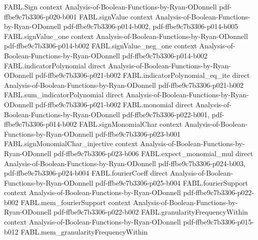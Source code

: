 \begin{theorem}
\label{FABL.kkl}
\leanok
{}
\proofstep
  {FABL.Sign}
  {context}
  {Analysis-of-Boolean-Functions-by-Ryan-ODonnell}
  {pdf-ffbe9c7b3306-p020-b001}
\proofstep
  {FABL.signValue}
  {context}
  {Analysis-of-Boolean-Functions-by-Ryan-ODonnell}
  {pdf-ffbe9c7b3306-p014-b002,
    pdf-ffbe9c7b3306-p014-b005}
\proofstep
  {FABL.signValue_one}
  {context}
  {Analysis-of-Boolean-Functions-by-Ryan-ODonnell}
  {pdf-ffbe9c7b3306-p014-b002}
\proofstep
  {FABL.signValue_neg_one}
  {context}
  {Analysis-of-Boolean-Functions-by-Ryan-ODonnell}
  {pdf-ffbe9c7b3306-p014-b002}
\proofstep
  {FABL.indicatorPolynomial}
  {direct}
  {Analysis-of-Boolean-Functions-by-Ryan-ODonnell}
  {pdf-ffbe9c7b3306-p021-b002}
\proofstep
  {FABL.indicatorPolynomial_eq_ite}
  {direct}
  {Analysis-of-Boolean-Functions-by-Ryan-ODonnell}
  {pdf-ffbe9c7b3306-p021-b002}
\proofstep
  {FABL.sum_indicatorPolynomial}
  {direct}
  {Analysis-of-Boolean-Functions-by-Ryan-ODonnell}
  {pdf-ffbe9c7b3306-p021-b002}
\proofstep
  {FABL.monomial}
  {direct}
  {Analysis-of-Boolean-Functions-by-Ryan-ODonnell}
  {pdf-ffbe9c7b3306-p022-b001,
    pdf-ffbe9c7b3306-p014-b002}
\proofstep
  {FABL.signMonomialChar}
  {context}
  {Analysis-of-Boolean-Functions-by-Ryan-ODonnell}
  {pdf-ffbe9c7b3306-p023-b001}
\proofstep
  {FABL.signMonomialChar_injective}
  {context}
  {Analysis-of-Boolean-Functions-by-Ryan-ODonnell}
  {pdf-ffbe9c7b3306-p023-b006}
\proofstep
  {FABL.expect_monomial_mul}
  {direct}
  {Analysis-of-Boolean-Functions-by-Ryan-ODonnell}
  {pdf-ffbe9c7b3306-p024-b003,
    pdf-ffbe9c7b3306-p024-b004}
\proofstep
  {FABL.fourierCoeff}
  {direct}
  {Analysis-of-Boolean-Functions-by-Ryan-ODonnell}
  {pdf-ffbe9c7b3306-p025-b004}
\proofstep
  {FABL.fourierSupport}
  {context}
  {Analysis-of-Boolean-Functions-by-Ryan-ODonnell}
  {pdf-ffbe9c7b3306-p022-b002}
\proofstep
  {FABL.mem_fourierSupport}
  {context}
  {Analysis-of-Boolean-Functions-by-Ryan-ODonnell}
  {pdf-ffbe9c7b3306-p022-b002}
\proofstep
  {FABL.granularityFrequencyWithin}
  {context}
  {Analysis-of-Boolean-Functions-by-Ryan-ODonnell}
  {pdf-ffbe9c7b3306-p015-b012}
\proofstep
  {FABL.mem_granularityFrequencyWithin}

\end{theorem}
